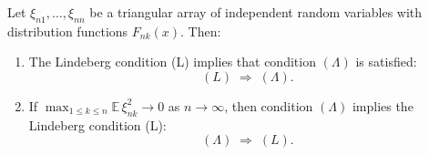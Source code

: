 Let $\xi_{n1}, \ldots, \xi_{nn}$ be a triangular array of independent random variables with distribution functions $F_{nk}(x)$. Then:

\begin{enumerate}
\item[(1)] The Lindeberg condition (L) implies that condition $(\Lambda)$ is satisfied:
$$(L) \;\Longrightarrow\; (\Lambda).$$

\item[(2)] If $\displaystyle\max_{1 \leq k \leq n} \mathbb{E}\,\xi_{nk}^{2} \rightarrow 0$ as $n \rightarrow \infty$, then condition $(\Lambda)$ implies the Lindeberg condition (L):
$$(\Lambda) \;\Longrightarrow\; (L).$$
\end{enumerate}
